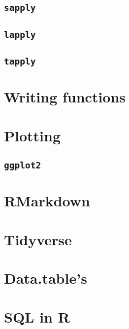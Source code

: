 \documentclass[
]{book}
\begin{document}
\hypertarget{r-sapply}{%
\subsection{\texorpdfstring{\texttt{sapply}}{sapply}}\label{r-sapply}}

\hypertarget{r-lapply}{%
\subsection{\texorpdfstring{\texttt{lapply}}{lapply}}\label{r-lapply}}

\hypertarget{r-tapply}{%
\subsection{\texorpdfstring{\texttt{tapply}}{tapply}}\label{r-tapply}}

\hypertarget{r-writing-functions}{%
\section{Writing functions}\label{r-writing-functions}}

\hypertarget{r-plotting}{%
\section{Plotting}\label{r-plotting}}

\hypertarget{r-ggplot2}{%
\subsection{\texorpdfstring{\texttt{ggplot2}}{ggplot2}}\label{r-ggplot2}}

\hypertarget{r-rmarkdown}{%
\section{RMarkdown}\label{r-rmarkdown}}

\hypertarget{r-tidyverse}{%
\section{Tidyverse}\label{r-tidyverse}}

\hypertarget{r-datatables}{%
\section{Data.table's}\label{r-datatables}}

\hypertarget{r-sql}{%
\section{SQL in R}\label{r-sql}}
\end{document}

